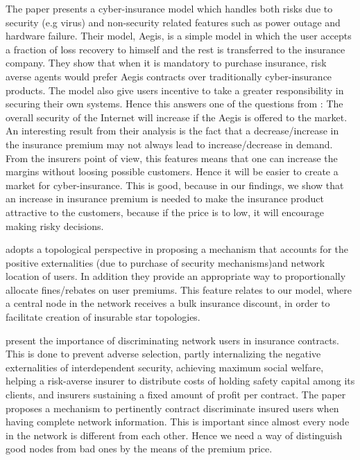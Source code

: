 The paper \cite{pal2011aegis} presents a cyber-insurance model which handles both risks due to security (e.g virus) and non-security related features such as power outage and hardware failure. Their model, Aegis, is a simple model in which the user accepts a fraction of loss recovery to himself and the rest is transferred to the insurance company. They show that when it is mandatory to purchase insurance, risk averse agents would prefer Aegis contracts over traditionally cyber-insurance products.
The model also give users incentive to take a greater responsibility in securing their own systems. Hence this answers one of the questions from \cite{bohme2010modeling}: The overall security of the Internet will increase if the Aegis is offered to the market. An interesting result from their analysis is the fact that a decrease/increase in the insurance premium may not always lead to increase/decrease in demand. From the insurers point of view, this features means that one can increase the margins without loosing possible customers. Hence it will be easier to create a market for cyber-insurance. This is good, because in our findings, we show that an increase in insurance premium is needed to make the insurance product attractive to the customers, because if the price is to low, it will encourage making risky decisions. 

\cite{pal2012cyberinsurance} adopts a topological perspective in proposing a mechanism that accounts for the positive
 externalities (due to purchase of security mechanisms)and network location of users. In addition they provide an appropriate way to proportionally allocate fines/rebates on user premiums. This feature relates to our model, where a central node in the network receives a bulk insurance discount, in order to facilitate creation of insurable star topologies. 
  
\cite{paldifferentiating} present the importance of discriminating network users in insurance contracts. This is done to prevent adverse selection, partly internalizing the negative externalities of interdependent security, achieving maximum social welfare, helping a risk-averse insurer to distribute costs of holding safety capital among its clients, and insurers sustaining a fixed amount of profit per contract.
The paper proposes a mechanism to pertinently contract discriminate insured users when having complete network information. This is important since almost every node in the network is different from each other. Hence we need a way of distinguish good nodes from bad ones by the means of the premium price.

  
